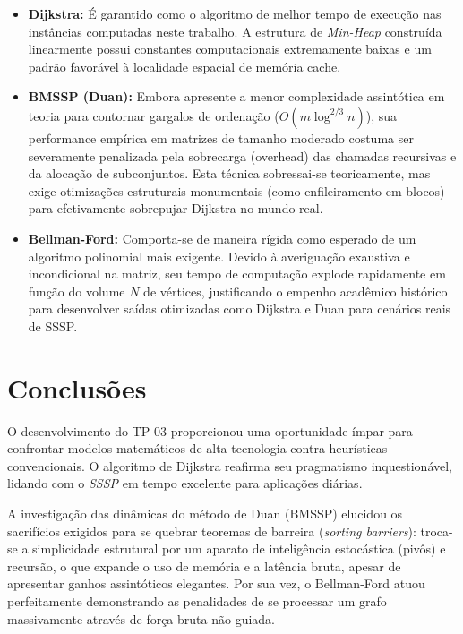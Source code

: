 \documentclass[12pt]{article}
\begin{document}


\begin{itemize}
    \item \textbf{Dijkstra:} É garantido como o algoritmo de melhor tempo de execução nas instâncias computadas neste trabalho. A estrutura de \textit{Min-Heap} construída linearmente possui constantes computacionais extremamente baixas e um padrão favorável à localidade espacial de memória cache.
    \item \textbf{BMSSP (Duan):} Embora apresente a menor complexidade assintótica em teoria para contornar gargalos de ordenação ($O(m \log^{2/3} n)$), sua performance empírica em matrizes de tamanho moderado costuma ser severamente penalizada pela sobrecarga (overhead) das chamadas recursivas e da alocação de subconjuntos. Esta técnica sobressai-se teoricamente, mas exige otimizações estruturais monumentais (como enfileiramento em blocos) para efetivamente sobrepujar Dijkstra no mundo real.
    \item \textbf{Bellman-Ford:} Comporta-se de maneira rígida como esperado de um algoritmo polinomial mais exigente. Devido à averiguação exaustiva e incondicional na matriz, seu tempo de computação explode rapidamente em função do volume $N$ de vértices, justificando o empenho acadêmico histórico para desenvolver saídas otimizadas como Dijkstra e Duan para cenários reais de SSSP.
\end{itemize}

\section{Conclusões}
\label{sec:conclusoes}

O desenvolvimento do TP 03 proporcionou uma oportunidade ímpar para confrontar modelos matemáticos de alta tecnologia contra heurísticas convencionais. O algoritmo de Dijkstra reafirma seu pragmatismo inquestionável, lidando com o \textit{SSSP} em tempo excelente para aplicações diárias.

A investigação das dinâmicas do método de Duan (BMSSP) elucidou os sacrifícios exigidos para se quebrar teoremas de barreira (\textit{sorting barriers}): troca-se a simplicidade estrutural por um aparato de inteligência estocástica (pivôs) e recursão, o que expande o uso de memória e a latência bruta, apesar de apresentar ganhos assintóticos elegantes. Por sua vez, o Bellman-Ford atuou perfeitamente demonstrando as penalidades de se processar um grafo massivamente através de força bruta não guiada. 
\end{document}
